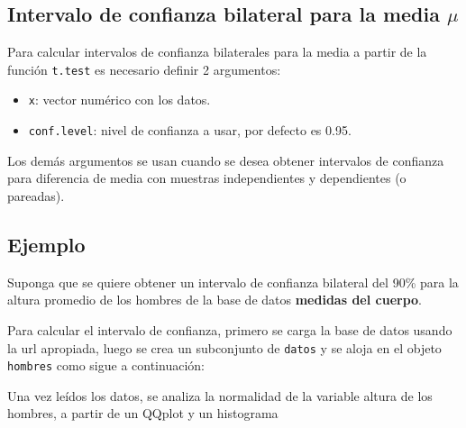 \documentclass[10pt,]{krantz}
\makeatletter
\newenvironment{Shaded}{\begin{snugshade}}{\end{snugshade}}
\newcommand{\KeywordTok}[1]{\textcolor[rgb]{0.13,0.29,0.53}{\textbf{#1}}}
\newcommand{\DataTypeTok}[1]{\textcolor[rgb]{0.13,0.29,0.53}{#1}}
\newcommand{\StringTok}[1]{\textcolor[rgb]{0.31,0.60,0.02}{#1}}
\newcommand{\OperatorTok}[1]{\textcolor[rgb]{0.81,0.36,0.00}{\textbf{#1}}}
\newcommand{\NormalTok}[1]{#1}
\providecommand{\tightlist}{%
  \setlength{\itemsep}{0pt}\setlength{\parskip}{0pt}}
\newenvironment{kframe}{%
\medskip{}
\setlength{\fboxsep}{.8em}
 \def\at@end@of@kframe{}%
 \ifinner\ifhmode%
  \def\at@end@of@kframe{\end{minipage}}%
  \begin{minipage}{\columnwidth}%
 \fi\fi%
 \def\FrameCommand##1{\hskip\@totalleftmargin \hskip-\fboxsep
 \colorbox{shadecolor}{##1}\hskip-\fboxsep
     \hskip-\linewidth \hskip-\@totalleftmargin \hskip\columnwidth}%
 \MakeFramed {\advance\hsize-\width
   \@totalleftmargin\z@ \linewidth\hsize
   \@setminipage}}%
 {\par\unskip\endMakeFramed%
 \at@end@of@kframe}
\renewenvironment{Shaded}{\begin{kframe}}{\end{kframe}}
\makeatother
\begin{document}
\subsection{\texorpdfstring{Intervalo de confianza bilateral para la
media
\(\mu\)}{Intervalo de confianza bilateral para la media \textbackslash{}mu}}\label{intervalo-de-confianza-bilateral-para-la-media-mu}

Para calcular intervalos de confianza bilaterales para la media a partir
de la función \texttt{t.test} es necesario definir 2 argumentos:

\begin{itemize}
\tightlist
\item
  \texttt{x}: vector numérico con los datos.
\item
  \texttt{conf.level}: nivel de confianza a usar, por defecto es 0.95.
\end{itemize}

Los demás argumentos se usan cuando se desea obtener intervalos de
confianza para diferencia de media con muestras independientes y
dependientes (o pareadas).

\subsection*{Ejemplo}\label{ejemplo-55}


Suponga que se quiere obtener un intervalo de confianza bilateral del
90\% para la altura promedio de los hombres de la base de datos
\textbf{medidas del cuerpo}.

Para calcular el intervalo de confianza, primero se carga la base de
datos usando la url apropiada, luego se crea un subconjunto de
\texttt{datos} y se aloja en el objeto \texttt{hombres} como sigue a
continuación:

\begin{Shaded}
\end{Shaded}

Una vez leídos los datos, se analiza la normalidad de la variable altura
de los hombres, a partir de un QQplot y un histograma
\end{document}
